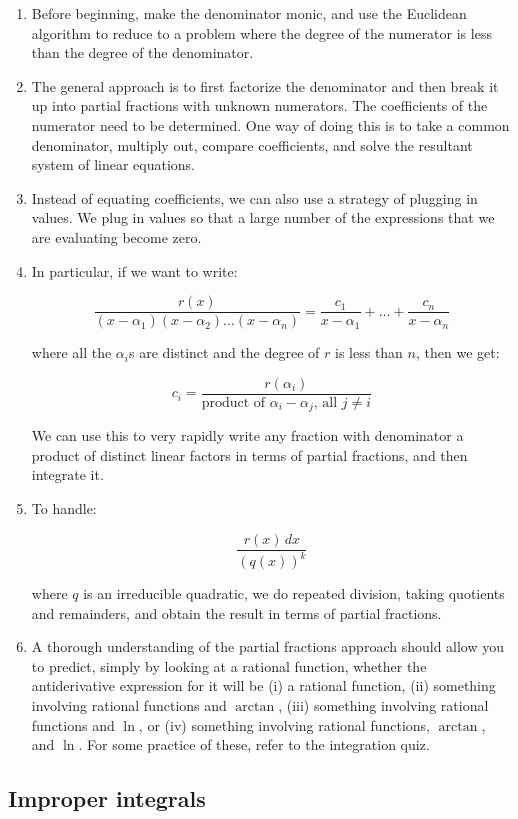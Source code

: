 \documentclass[10pt]{amsart}
\begin{document}
\begin{enumerate}
\item Before beginning, make the denominator monic, and use the
  Euclidean algorithm to reduce to a problem where the degree of the
  numerator is less than the degree of the denominator.
\item The general approach is to first factorize the denominator and
  then break it up into partial fractions with unknown numerators. The
  coefficients of the numerator need to be determined. One way of
  doing this is to take a common denominator, multiply out, compare
  coefficients, and solve the resultant system of linear equations.
\item Instead of equating coefficients, we can also use a strategy of
  plugging in values. We plug in values so that a large number of the
  expressions that we are evaluating become zero.
\item In particular, if we want to write:

  $$\frac{r(x)}{(x - \alpha_1)(x - \alpha_2) \dots (x - \alpha_n)} = \frac{c_1}{x - \alpha_1} + \dots + \frac{c_n}{x - \alpha_n}$$

  where all the $\alpha_i$s are distinct and the degree of $r$ is less
  than $n$, then we get:

  $$c_i = \frac{r(\alpha_i)}{\text{product of $\alpha_i - \alpha_j$, all $j \ne i$}}$$

  We can use this to very rapidly write any fraction with denominator
  a product of distinct linear factors in terms of partial fractions,
  and then integrate it.
\item To handle:

  $$\frac{r(x) \, dx}{(q(x))^k}$$

  where $q$ is an irreducible quadratic, we do repeated division,
  taking quotients and remainders, and obtain the result in terms of
  partial fractions.
\item A thorough understanding of the partial fractions approach
  should allow you to predict, simply by looking at a rational
  function, whether the antiderivative expression for it will be (i) a
  rational function, (ii) something involving rational functions and
  $\arctan$, (iii) something involving rational functions and $\ln$,
  or (iv) something involving rational functions, $\arctan$, and
  $\ln$. For some practice of these, refer to the integration quiz.
\end{enumerate}

\subsection{Improper integrals}
\end{document}
